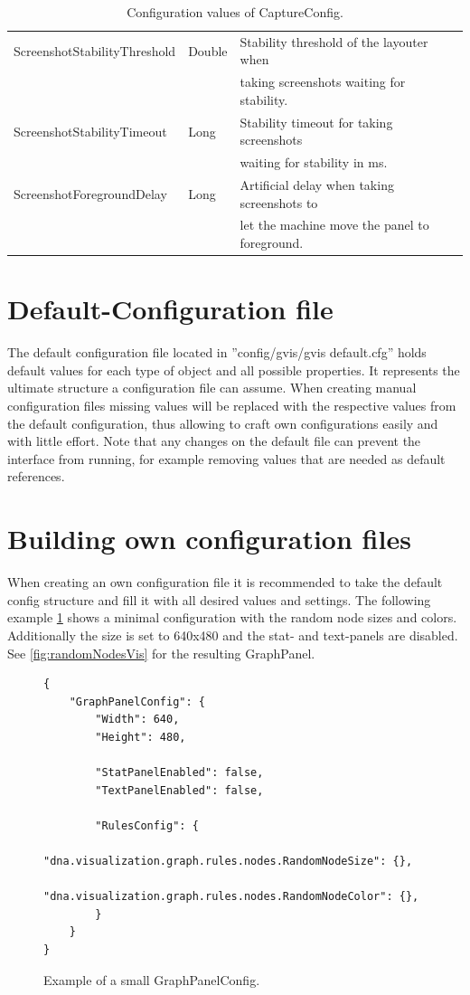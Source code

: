 \begin{table}[h]
\begin{tabular}[h]{|l|l|l|}
	\hline
	ScreenshotStabilityThreshold & Double & Stability threshold of the layouter when\\
	& & taking screenshots waiting for stability.\\
	\hline
	ScreenshotStabilityTimeout & Long & Stability timeout for taking screenshots\\
	& & waiting for stability in ms.\\
	\hline
	ScreenshotForegroundDelay & Long & Artificial delay when taking screenshots to\\
	& & let the machine move the panel to foreground.\\
	\hline
\end{tabular}
\caption{Configuration values of CaptureConfig.}
\label{tab:captureConfigValues}
\end{table}

\section{Default-Configuration file}
The default configuration file located in ”config/gvis/gvis default.cfg” holds default values for each type of object and all possible properties. It represents the ultimate structure a configuration file can assume. When creating manual configuration files missing values will be replaced with the respective values from the default configuration, thus allowing to craft own configurations easily and with little effort. Note that any changes on the default file can prevent the interface from running, for example removing values that are needed as default references.

\section{Building own configuration files}
When creating an own configuration file it is recommended to take the default config structure and fill it with all desired values and settings. The following example \ref{config:randomNodes} shows a minimal configuration with the random node sizes and colors. Additionally the size is set to 640x480 and the stat- and text-panels are disabled. See \ref{fig:randomNodesVis} for the resulting GraphPanel.

\begin{figure} [h]
\begin{lstlisting}
{
	"GraphPanelConfig": {
		"Width": 640, 
		"Height": 480,
	
		"StatPanelEnabled": false,
		"TextPanelEnabled": false,
	
		"RulesConfig": {	
			"dna.visualization.graph.rules.nodes.RandomNodeSize": {},
			"dna.visualization.graph.rules.nodes.RandomNodeColor": {},
		}
	}
}
\end{lstlisting}
\caption{Example of a small GraphPanelConfig.}
\label{config:randomNodes}
\end{figure}


